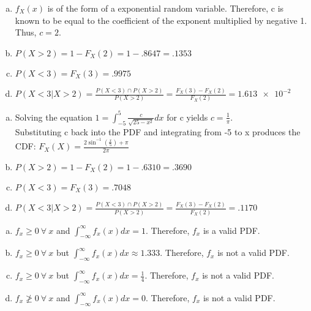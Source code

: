 \documentclass[12pt]{article}
\newenvironment{problem}[2][Problem]{\begin{trivlist}
\item[\hskip \labelsep {\bfseries #1}\hskip \labelsep {\bfseries #2.}]
  \vspace{1 cm}
}{\end{trivlist}}
\begin{document}
\begin{problem}{3.13}
\item
  \begin{enumerate}[a.]
    \item %
      $f_X(x)$ is of the form of a exponential random variable. Therefore,
      c is known to be equal to the coefficient of the exponent multiplied
      by negative 1. Thus, $c = 2$.
    \item %
      $P(X>2) = 1 - F_X(2) = 1 - .8647 = .1353$
    \item %
      $P(X<3) = F_X(3) = .9975$
    \item %
      $P(X < 3|X>2) = \frac{P(X<3)\cap P(X>2)}{P(X>2)}
      = \frac{F_X(3) - F_X(2)}{F_X(2)} = \num{1.613e-2}$
  \end{enumerate}
\end{problem}

\begin{problem}{3.15}
\item
  \begin{enumerate}[a.]
    \item %
    Solving the equation $1 = \int_{-5}^5 \frac{c}{\sqrt{25-x^2}}dx$ for c
      yields $c = \frac{1}{\pi}$. \\
      Substituting c back into the PDF and integrating from -5 to x produces
      the CDF: $F_X(X) = \frac{2\sin^{-1}(\frac{x}{5})+\pi}{2\pi}$
    \item %
      $P(X>2) = 1 - F_X(2) = 1 - .6310 = .3690$
    \item %
      $P(X<3) = F_X(3) = .7048$
    \item %
      $P(X < 3|X>2) = \frac{P(X<3)\cap P(X>2)}{P(X>2)}
      = \frac{F_X(3) - F_X(2)}{F_X(2)} = .1170$
  \end{enumerate}
\end{problem}

\begin{problem}{3.17}
\item
  \begin{enumerate}[a.]
    \item %
      $f_x \geq 0 \ \forall \ x$ and $\int_{-\infty}^{\infty} f_x(x)dx = 1$.
      Therefore, $f_x$ is a valid PDF.
    \item %
      $f_x \geq 0 \ \forall \ x$ but $\int_{-\infty}^{\infty} f_x(x)dx \approx 1.333$.
      Therefore, $f_x$ is not a valid PDF.
    \item %
      $f_x \geq 0 \ \forall \ x$ but $\int_{-\infty}^{\infty} f_x(x)dx =
      \frac{1}{4}$. Therefore, $f_x$ is not a valid PDF.
    \item %
      $f_x \ngeq 0 \ \forall \ x$ and $\int_{-\infty}^{\infty} f_x(x)dx = 0$.
      Therefore, $f_x$ is not a valid PDF.
  \end{enumerate}
\end{problem}
\end{document}
